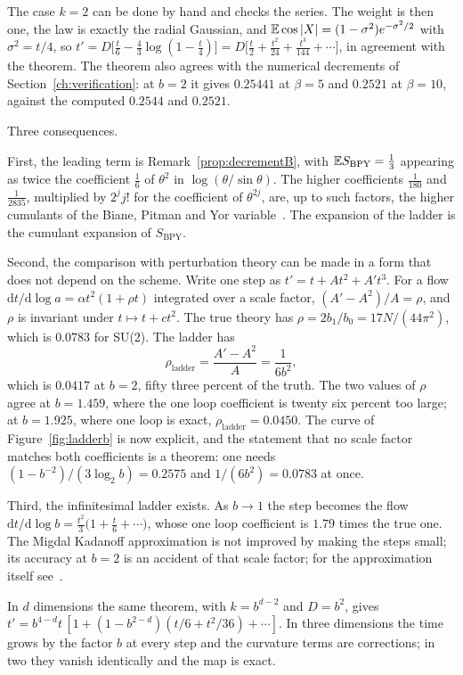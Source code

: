 The case $k=2$ can be done by hand and checks the series. The weight is then one, the law is exactly the radial Gaussian, and $\mathbb{E}\cos|X|=(1-\sigma^2)e^{-\sigma^2/2}$ with $\sigma^2=t/4$, so $t'=D\big[\frac t6-\frac43\log(1-\frac t4)\big]=D\big[\frac t2+\frac{t^2}{24}+\frac{t^3}{144}+\cdots\big]$, in agreement with the theorem. The theorem also agrees with the numerical decrements of Section~\ref{ch:verification}: at $b=2$ it gives $0.25441$ at $\beta=5$ and $0.2521$ at $\beta=10$, against the computed $0.2544$ and $0.2521$.

Three consequences.

First, the leading term is Remark~\ref{prop:decrementB}, with $\mathbb{E} S_{\mathrm{BPY}}=\frac13$ appearing as twice the coefficient $\frac16$ of $\theta^2$ in $\log(\theta/\sin\theta)$. The higher coefficients $\frac1{180}$ and $\frac1{2835}$, multiplied by $2^jj!$ for the coefficient of $\theta^{2j}$, are, up to such factors, the higher cumulants of the Biane, Pitman and Yor variable~\cite{BPY}. The expansion of the ladder is the cumulant expansion of $S_{\mathrm{BPY}}$.

Second, the comparison with perturbation theory can be made in a form that does not depend on the scheme. Write one step as $t'=t+At^2+A't^3$. For a flow $\mathrm dt/\mathrm d\log a=\alpha t^2(1+\rho t)$ integrated over a scale factor, $(A'-A^2)/A=\rho$, and $\rho$ is invariant under $t\mapsto t+ct^2$. The true theory has $\rho=2b_1/b_0=17N/(44\pi^2)$, which is $0.0783$ for SU(2). The ladder has
\[
\rho_{\mathrm{ladder}}=\frac{A'-A^2}{A}=\frac{1}{6b^2},
\]
which is $0.0417$ at $b=2$, fifty three percent of the truth. The two values of $\rho$ agree at $b=1.459$, where the one loop coefficient is twenty six percent too large; at $b=1.925$, where one loop is exact, $\rho_{\mathrm{ladder}}=0.0450$. The curve of Figure~\ref{fig:ladderb} is now explicit, and the statement that no scale factor matches both coefficients is a theorem: one needs $(1-b^{-2})/(3\log_2b)=0.2575$ and $1/(6b^2)=0.0783$ at once.

Third, the infinitesimal ladder exists. As $b\to1$ the step becomes the flow $\mathrm dt/\mathrm d\log b=\frac{t^2}{3}\big(1+\frac t6+\cdots\big)$, whose one loop coefficient is $1.79$ times the true one. The Migdal Kadanoff approximation is not improved by making the steps small; its accuracy at $b=2$ is an accident of that scale factor; for the approximation itself see~\cite{Mi75,Ka76}.

In $d$ dimensions the same theorem, with $k=b^{d-2}$ and $D=b^2$, gives $t'=b^{4-d}t\,[1+(1-b^{2-d})(t/6+t^2/36)+\cdots]$. In three dimensions the time grows by the factor $b$ at every step and the curvature terms are corrections; in two they vanish identically and the map is exact.

